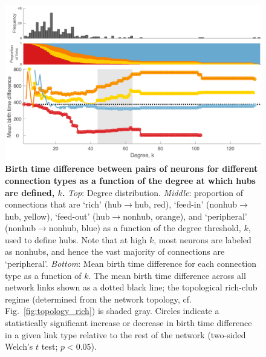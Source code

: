 \documentclass[10pt,letterpaper]{article}
\begin{document}
{%
\begin{figure}[!h]
\label{BirthTimesk}
\centering
    \includegraphics[width=1\textwidth]{birthTimeRPFALL.pdf}
    \caption{
    \textbf{Birth time difference between pairs of neurons for different connection types as a function of the degree at which hubs are defined, $k$.}
\emph{Top}: Degree distribution.
\emph{Middle}: proportion of connections that are `rich' (hub$\rightarrow$hub, red), `feed-in' (nonhub$\rightarrow$hub, yellow), `feed-out' (hub$\rightarrow$nonhub, orange), and `peripheral' (nonhub$\rightarrow$nonhub, blue) as a function of the degree threshold, $k$, used to define hubs.
Note that at high $k$, most neurons are labeled as nonhubs, and hence the vast majority of connections are `peripheral'.
\emph{Bottom}: Mean birth time difference for each connection type as a function of $k$.
The mean birth time difference across all network links shown as a dotted black line; the topological rich-club regime (determined from the network topology, cf. Fig.~\ref{fig:topology_rich}) is shaded gray.
Circles indicate a statistically significant increase or decrease in birth time difference in a given link type relative to the rest of the network (two-sided Welch's $t$ test; $p < 0.05$).
}
\end{figure}


}
\end{document}
